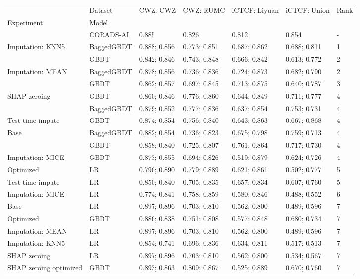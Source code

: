 \begin{tabular}{lllllll}
\toprule
                       & Dataset &       CWZ: CWZ &      CWZ: RUMC &  iCTCF: Liyuan &   iCTCF: Union & Rank \\
Experiment & Model &                &                &                &                &      \\
\midrule
                       & CORADS-AI &          0.885 &          0.826 &          0.812 &          0.854 &    - \\
Imputation: KNN5 & BaggedGBDT &  0.888;  0.856 &  0.773;  0.851 &  0.687;  0.862 &  0.688;  0.811 &    1 \\
                       & GBDT &  0.842;  0.846 &  0.743;  0.848 &  0.666;  0.842 &  0.613;  0.772 &    2 \\
Imputation: MEAN & BaggedGBDT &  0.878;  0.856 &  0.736;  0.836 &  0.724;  0.873 &  0.682;  0.790 &    2 \\
                       & GBDT &  0.862;  0.857 &  0.697;  0.845 &  0.713;  0.875 &  0.640;  0.787 &    3 \\
SHAP zeroing & GBDT &  0.860;  0.846 &  0.776;  0.860 &  0.644;  0.849 &  0.711;  0.777 &    4 \\
                       & BaggedGBDT &  0.879;  0.852 &  0.777;  0.836 &  0.637;  0.854 &  0.753;  0.731 &    4 \\
Test-time impute & GBDT &  0.874;  0.854 &  0.756;  0.840 &  0.643;  0.863 &  0.667;  0.868 &    4 \\
Base & BaggedGBDT &  0.882;  0.854 &  0.736;  0.823 &  0.675;  0.798 &  0.759;  0.713 &    4 \\
                       & GBDT &  0.858;  0.840 &  0.725;  0.807 &  0.761;  0.864 &  0.717;  0.730 &    4 \\
Imputation: MICE & GBDT &  0.873;  0.855 &  0.694;  0.826 &  0.519;  0.879 &  0.624;  0.726 &    4 \\
Optimized & LR &  0.796;  0.890 &  0.779;  0.889 &  0.621;  0.861 &  0.502;  0.777 &    5 \\
Test-time impute & LR &  0.850;  0.840 &  0.705;  0.835 &  0.657;  0.834 &  0.607;  0.760 &    5 \\
Imputation: MICE & LR &  0.774;  0.841 &  0.758;  0.859 &  0.580;  0.846 &  0.488;  0.552 &    6 \\
Base & LR &  0.897;  0.896 &  0.703;  0.810 &  0.562;  0.800 &  0.489;  0.596 &    7 \\
Optimized & GBDT &  0.886;  0.838 &  0.751;  0.808 &  0.577;  0.848 &  0.680;  0.734 &    7 \\
Imputation: MEAN & LR &  0.897;  0.896 &  0.703;  0.810 &  0.562;  0.800 &  0.489;  0.596 &    7 \\
Imputation: KNN5 & LR &  0.854;  0.741 &  0.696;  0.836 &  0.634;  0.811 &  0.517;  0.513 &    7 \\
SHAP zeroing & LR &  0.897;  0.896 &  0.703;  0.810 &  0.562;  0.800 &  0.534;  0.567 &    7 \\
SHAP zeroing optimized & GBDT &  0.893;  0.863 &  0.809;  0.867 &  0.525;  0.889 &  0.670;  0.760 &    7 \\
\bottomrule
\end{tabular}
